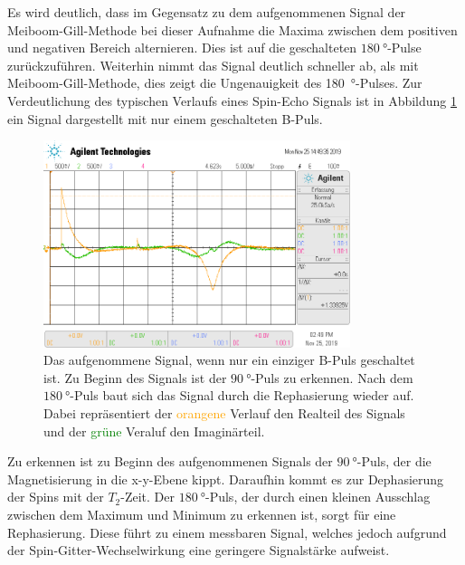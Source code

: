 Es wird deutlich, dass im Gegensatz zu dem aufgenommenen Signal der Meiboom-Gill-Methode bei dieser Aufnahme die Maxima zwischen
dem positiven und negativen Bereich alternieren. Dies ist auf die geschalteten $\SI{180}{\degree}$-Pulse zurückzuführen.
Weiterhin nimmt das Signal deutlich schneller ab, als mit Meiboom-Gill-Methode, dies zeigt die Ungenauigkeit des \SI{180}{\degree}-Pulses.
Zur Verdeutlichung des typischen Verlaufs eines Spin-Echo Signals ist in Abbildung \ref{fig:N1} ein Signal dargestellt mit nur einem
geschalteten B-Puls.
\begin{figure}[H]
  \centering
  \includegraphics[width=0.8\textwidth]{../data/scope_77.png}
  \caption{Das aufgenommene Signal, wenn nur ein einziger B-Puls geschaltet ist. Zu Beginn des Signals ist der
  $\SI{90}{\degree}$-Puls zu erkennen. Nach dem $\SI{180}{\degree}$-Puls baut sich das Signal durch die Rephasierung
  wieder auf. Dabei repräsentiert der \textcolor{orange}{orangene} 
  Verlauf den Realteil des Signals und der \textcolor{green}{grüne} Veraluf den Imaginärteil.}
  \label{fig:N1}
\end{figure} \noindent
Zu erkennen ist zu Beginn des aufgenommenen Signals der $\SI{90}{\degree}$-Puls, der die Magnetisierung in die x-y-Ebene kippt.
Daraufhin kommt es zur Dephasierung der Spins mit der $T_2$-Zeit. Der $\SI{180}{\degree}$-Puls, der durch einen kleinen Ausschlag
zwischen dem Maximum und Minimum zu erkennen ist, sorgt für eine Rephasierung. Diese führt zu einem messbaren Signal, welches
jedoch aufgrund der Spin-Gitter-Wechselwirkung eine geringere Signalstärke aufweist.

